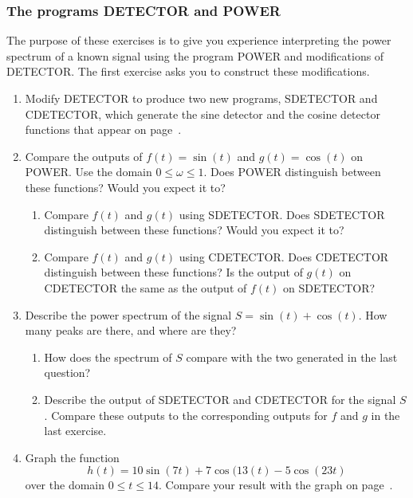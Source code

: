 \subsubsection{The programs DETECTOR and POWER}
\label{subsubsec:the-programs-detector-and-power}


The purpose of these exercises is to give you experience interpreting
the power spectrum of a known signal using the program POWER and
modifications of DETECTOR.  The first exercise asks you to construct
these modifications.


\begin{enumerate}
\item Modify DETECTOR to produce two new programs, SDETECTOR and
CDETECTOR, which generate the sine detector and the cosine detector
functions that appear on page~\pageref{detectors}.


\item Compare the outputs of $f(t) = \sin(t)$ and $g(t) = \cos(t)$ on
POWER.  Use the domain $0 \leq \omega \leq 1$.  Does POWER distinguish
between these functions?  Would you expect it to?

  \begin{enumerate}
  \item Compare $f(t)$ and $g(t)$ using SDETECTOR.  Does SDETECTOR
distinguish between these functions?  Would you expect it to?

  \item Compare $f(t)$ and $g(t)$ using CDETECTOR.  Does CDETECTOR
distinguish between these functions?  Is the output of $g(t)$ on
CDETECTOR the same as the output of $f(t)$ on SDETECTOR?


\end{enumerate}
\item Describe the power spectrum of the signal $S = \sin(t) +
\cos(t)$.  How many peaks are there, and where are they?

  \begin{enumerate}
  \item How does the spectrum of $S$ compare with the two generated in
the last question?

  \item Describe the output of SDETECTOR and CDETECTOR for the signal
$S$.  Compare these outputs to the corresponding outputs for $f$ and
$g$ in the last exercise.


\end{enumerate}
\item Graph the function
	\[
h(t) = 10\sin(7t) + 7 \cos(13(t) - 5 \cos(23t)
\]
over the domain $0 \leq t \leq 14$.  Compare your result with the
graph on page~\pageref{testfunction}.


\end{enumerate}
